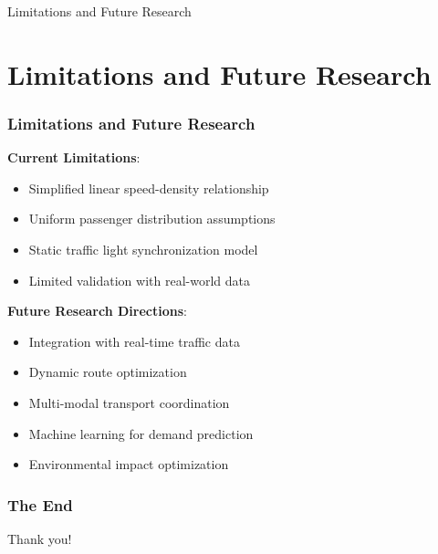 \documentclass[12pt]{beamer}
\begin{document}
\begin{frame}
\begin{center}
\Huge{Limitations and Future Research}
\end{center}
\end{frame}

\section{Limitations and Future Research}
\begin{frame}
\frametitle{Limitations and Future Research}

\vspace{0.2cm}
\textbf{Current Limitations}:
\begin{itemize}
\item Simplified linear speed-density relationship
\item Uniform passenger distribution assumptions
\item Static traffic light synchronization model
\item Limited validation with real-world data
\end{itemize}

\vspace{0.5cm}
\textbf{Future Research Directions}:
\begin{itemize}
\item Integration with real-time traffic data
\item Dynamic route optimization
\item Multi-modal transport coordination
\item Machine learning for demand prediction
\item Environmental impact optimization
\end{itemize}

\end{frame}

\begin{frame}
\frametitle{The End}
\begin{center}
\Huge{Thank you!}
\end{center}
\end{frame}
\end{document}
